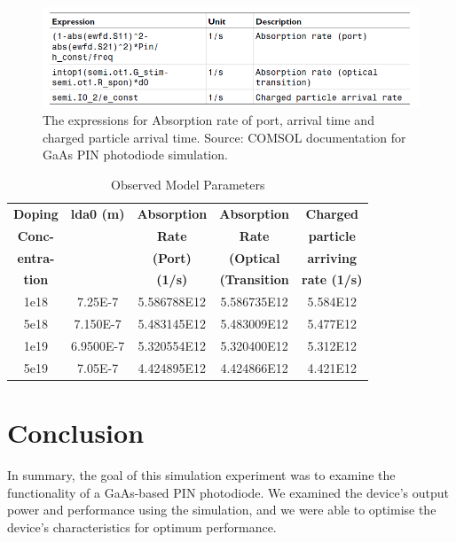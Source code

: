\documentclass[conference]{IEEEtran}
\begin{document}
\begin{figure}
\begin{center}
\includegraphics[scale = 0.4]{Calc.png}
\caption{The expressions for Absorption rate of port, arrival time and charged particle arrival time. Source: COMSOL documentation for GaAs PIN photodiode simulation.}
\end{center}
\end{figure}
\begin{table}[htbp]
\caption{Observed Model Parameters}
\begin{center}
\begin{tabular}{|c|c|c|c|c|}
\hline
\textbf{Doping} & \textbf{lda0 (m)}& \textbf{ Absorption}& \textbf{Absorption }& \textbf{Charged} \\
\textbf{Conc-} & & \textbf{Rate}& \textbf{Rate}& \textbf{particle} \\
\textbf{entra-} & & \textbf{(Port)}& \textbf{(Optical}& \textbf{arriving} \\
\textbf{tion} & & \textbf{(1/s)}& \textbf{(Transition}& \textbf{rate (1/s)} \\
\hline
1e18& 7.25E-7 & 5.586788E12 & 5.586735E12  & 5.584E12  \\
\hline
5e18& 7.150E-7 & 5.483145E12  & 5.483009E12 & 5.477E12 \\
\hline
1e19& 6.9500E-7 &  5.320554E12 & 5.320400E12 & 5.312E12  \\
\hline
5e19& 7.05E-7 &  4.424895E12 & 4.424866E12 & 4.421E12  \\
\hline

\end{tabular}
\label{tab1}
\end{center}
\end{table}




\section{Conclusion}
In summary, the goal of this simulation experiment was to examine the functionality of a GaAs-based PIN photodiode. We examined the device's output power and  performance using the simulation, and we were able to optimise the device's characteristics for optimum performance.\\
\end{document}
